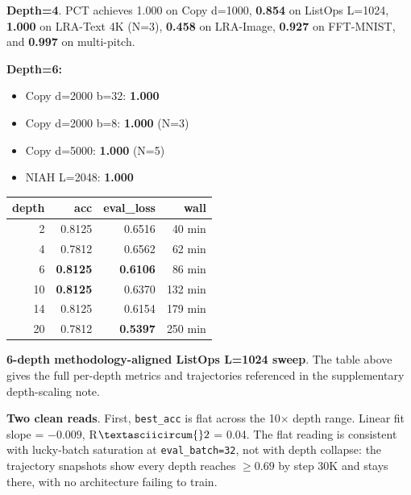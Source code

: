 \documentclass[11pt,a4paper]{article}
\theoremstyle{plain}
\theoremstyle{definition}
\begin{document}
\textbf{Depth=4}. PCT achieves 1.000 on Copy d=1000, \textbf{0.854} on ListOps L=1024, \textbf{1.000} on LRA-Text 4K (N=3), \textbf{0.458} on LRA-Image, \textbf{0.927} on FFT-MNIST, and \textbf{0.997} on multi-pitch.

\noindent
\begin{minipage}[t]{0.54\textwidth}
\vspace{0pt}
\textbf{Depth=6:}
\begin{itemize}
  \item Copy d=2000 b=32: \textbf{1.000}
  \item Copy d=2000 b=8: \textbf{1.000} (N=3)
  \item Copy d=5000: \textbf{1.000} (N=5)
  \item NIAH L=2048: \textbf{1.000}
\end{itemize}
\end{minipage}\hfill
\begin{minipage}[t]{0.38\textwidth}
\vspace{0pt}
\centering
{\footnotesize
\setlength{\tabcolsep}{3pt}
\renewcommand{\arraystretch}{1.08}
\begin{tabular}{|r|r|r|r|}
\hline
depth & acc & eval\_loss & wall \\
\hline
2 & 0.8125 & 0.6516 & 40 min \\
\hline
4 & 0.7812 & 0.6562 & 62 min \\
\hline
6 & \textbf{0.8125} & \textbf{0.6106} & 86 min \\
\hline
10 & \textbf{0.8125} & 0.6370 & 132 min \\
\hline
14 & 0.8125 & 0.6154 & 179 min \\
\hline
20 & 0.7812 & \textbf{0.5397} & 250 min \\
\hline
\end{tabular}}
\captionsetup{skip=2pt}
\end{minipage}
\par\medskip

\textbf{6-depth methodology-aligned ListOps L=1024 sweep}. The table above gives the full per-depth metrics and trajectories referenced in the supplementary depth-scaling note.

\textbf{Two clean reads}. First, \texttt{best\_acc} is flat across the 10$\times$ depth range. Linear fit slope = $-0.009$, R$\textasciicircum{}2$ = 0.04. The flat reading is consistent with lucky-batch saturation at \texttt{eval\_batch=32}, not with depth collapse: the trajectory snapshots show every depth reaches $\geq 0.69$ by step 30K and stays there, with no architecture failing to train.
\end{document}
